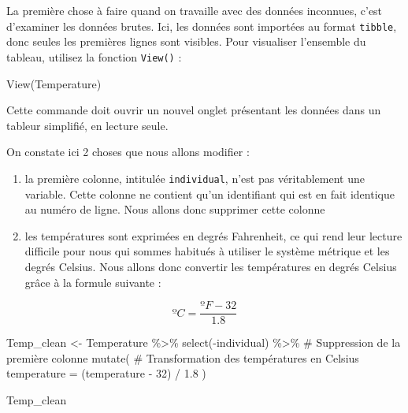 \documentclass[
  a4paper,
]{article}
\newenvironment{Shaded}{\begin{snugshade}}{\end{snugshade}}
\newcommand{\AttributeTok}[1]{\textcolor[rgb]{0.00,0.34,0.68}{#1}}
\newcommand{\CommentTok}[1]{\textcolor[rgb]{0.54,0.53,0.53}{#1}}
\newcommand{\DecValTok}[1]{\textcolor[rgb]{0.69,0.50,0.00}{#1}}
\newcommand{\FloatTok}[1]{\textcolor[rgb]{0.69,0.50,0.00}{#1}}
\newcommand{\FunctionTok}[1]{\textcolor[rgb]{0.39,0.29,0.61}{#1}}
\newcommand{\NormalTok}[1]{\textcolor[rgb]{0.12,0.11,0.11}{#1}}
\newcommand{\OtherTok}[1]{\textcolor[rgb]{0.00,0.43,0.16}{#1}}
\newcommand{\SpecialCharTok}[1]{\textcolor[rgb]{0.24,0.68,0.91}{#1}}
\providecommand{\tightlist}{%
  \setlength{\itemsep}{0pt}\setlength{\parskip}{0pt}}
\begin{document}
La première chose à faire quand on travaille avec des données inconnues, c'est d'examiner les données brutes. Ici, les données sont importées au format \texttt{tibble}, donc seules les premières lignes sont visibles. Pour visualiser l'ensemble du tableau, utilisez la fonction \texttt{View()} :

\begin{Shaded}
\begin{Highlighting}[]
\FunctionTok{View}\NormalTok{(Temperature)}
\end{Highlighting}
\end{Shaded}

Cette commande doit ouvrir un nouvel onglet présentant les données dans un tableur simplifié, en lecture seule.

On constate ici 2 choses que nous allons modifier :

\begin{enumerate}
\def\labelenumi{\arabic{enumi}.}
\tightlist
\item
  la première colonne, intitulée \texttt{individual}, n'est pas véritablement une variable. Cette colonne ne contient qu'un identifiant qui est en fait identique au numéro de ligne. Nous allons donc supprimer cette colonne
\item
  les températures sont exprimées en degrés Fahrenheit, ce qui rend leur lecture difficile pour nous qui sommes habitués à utiliser le système métrique et les degrés Celsius. Nous allons donc convertir les températures en degrés Celsius grâce à la formule suivante :
\end{enumerate}

\[ºC = \frac{ºF - 32}{1.8}\]

\begin{Shaded}
\begin{Highlighting}[]
\NormalTok{Temp\_clean }\OtherTok{\textless{}{-}}\NormalTok{ Temperature }\SpecialCharTok{\%\textgreater{}\%} 
  \FunctionTok{select}\NormalTok{(}\SpecialCharTok{{-}}\NormalTok{individual) }\SpecialCharTok{\%\textgreater{}\%}      \CommentTok{\# Suppression de la première colonne}
  \FunctionTok{mutate}\NormalTok{(                      }\CommentTok{\# Transformation des températures en Celsius}
    \AttributeTok{temperature =}\NormalTok{ (temperature }\SpecialCharTok{{-}} \DecValTok{32}\NormalTok{) }\SpecialCharTok{/} \FloatTok{1.8}
\NormalTok{    )}

\NormalTok{Temp\_clean}
\end{Highlighting}
\end{Shaded}
\end{document}
